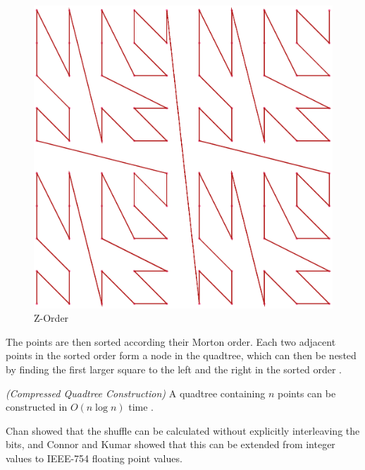 \documentclass[mcs]{scsthesis}
\begin{document}
\begin{figure}
\begin{center}
\includegraphics[scale=0.35]{diagrams/zorder.eps}
\caption{Z-Order}
\label{fig:z_order}
\end{center}
\end{figure}

The points are then sorted according their Morton order. Each two adjacent
points in the sorted order form a node in the quadtree, which can then be
nested by finding the first larger square to the left and the right in the
sorted order \cite{bern}.

\begin{thm} \emph{(Compressed Quadtree Construction)}
A quadtree containing $n$ points can be constructed in \(O(n \log n)\) time
\cite{bern}.
\end{thm}

Chan \cite{chan} showed that the shuffle can be calculated without explicitly
interleaving the bits, and Connor and Kumar \cite{connor} showed that this can
be extended from integer values to IEEE-754 floating point values.
\end{document}

